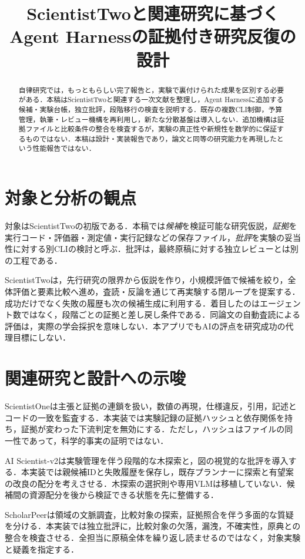 \documentclass[submit,techrep,noauthor]{ipsj}
\title{ScientistTwoと関連研究に基づく\\Agent Harnessの証拠付き研究反復の設計}
\begin{document}
\begin{abstract}
自律研究では，もっともらしい完了報告と，実験で裏付けられた成果を区別する必要がある．本稿はScientistTwoと関連する一次文献を整理し，Agent Harnessに追加する候補・実験台帳，独立批評，段階移行の検査を説明する．既存の複数CLI制御，予算管理，執筆・レビュー機構を再利用し，新たな分散基盤は導入しない．追加機構は証拠ファイルと比較条件の整合を検査するが，実験の真正性や新規性を数学的に保証するものではない．本稿は設計・実装報告であり，論文と同等の研究能力を再現したという性能報告ではない．
\end{abstract}
\maketitle

\section{対象と分析の観点}
対象はScientistTwoの初版\cite{two}である．本稿では\emph{候補}を検証可能な研究仮説，\emph{証拠}を実行コード・評価器・測定値・実行記録などの保存ファイル，\emph{批評}を実験の妥当性に対する別CLIの検討と呼ぶ．批評は，最終原稿に対する独立レビューとは別の工程である．

ScientistTwoは，先行研究の限界から仮説を作り，小規模評価で候補を絞り，全体評価と要素比較へ進め，査読・反論を通じて再実験する閉ループを提案する．成功だけでなく失敗の履歴も次の候補生成に利用する\cite{two}．着目したのはエージェント数ではなく，段階ごとの証拠と差し戻し条件である．同論文の自動査読による評価は，実際の学会採択を意味しない．本アプリでもAIの評点を研究成功の代理目標にしない．

\section{関連研究と設計への示唆}
ScientistOneは主張と証拠の連鎖を扱い，数値の再現，仕様違反，引用，記述とコードの一致を監査する\cite{one}．本実装では実験記録の証拠ハッシュと依存関係を持ち，証拠が変わった下流判定を無効にする．ただし，ハッシュはファイルの同一性であって，科学的事実の証明ではない．

AI Scientist-v2は実験管理を伴う段階的な木探索と，図の視覚的な批評を導入する\cite{v2}．本実装では親候補IDと失敗履歴を保存し，既存プランナーに探索と有望案の改良の配分を考えさせる．木探索の選択則や専用VLMは移植していない．候補間の資源配分を後から検証できる状態を先に整備する．

ScholarPeerは領域の文脈調査，比較対象の探索，証拠照合を伴う多面的な質疑を分ける\cite{peer}．本実装では独立批評に，比較対象の欠落，漏洩，不確実性，原典との整合を検査させる．全担当に原稿全体を繰り返し読ませるのではなく，対象実験と疑義を指定する．
\end{document}
